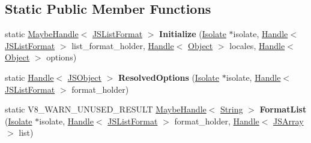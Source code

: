 \subsection*{Static Public Member Functions}
\begin{DoxyCompactItemize}
\item 
\mbox{\label{classv8_1_1internal_1_1JSListFormat_a1d611393a3198007804707acba4a9ff2}} 
static \mbox{\hyperlink{classv8_1_1internal_1_1MaybeHandle}{Maybe\+Handle}}$<$ \mbox{\hyperlink{classv8_1_1internal_1_1JSListFormat}{J\+S\+List\+Format}} $>$ {\bfseries Initialize} (\mbox{\hyperlink{classv8_1_1internal_1_1Isolate}{Isolate}} $\ast$isolate, \mbox{\hyperlink{classv8_1_1internal_1_1Handle}{Handle}}$<$ \mbox{\hyperlink{classv8_1_1internal_1_1JSListFormat}{J\+S\+List\+Format}} $>$ list\+\_\+format\+\_\+holder, \mbox{\hyperlink{classv8_1_1internal_1_1Handle}{Handle}}$<$ \mbox{\hyperlink{classv8_1_1internal_1_1Object}{Object}} $>$ locales, \mbox{\hyperlink{classv8_1_1internal_1_1Handle}{Handle}}$<$ \mbox{\hyperlink{classv8_1_1internal_1_1Object}{Object}} $>$ options)
\item 
\mbox{\label{classv8_1_1internal_1_1JSListFormat_a7a9e5f699099574bb05e18cb330591bd}} 
static \mbox{\hyperlink{classv8_1_1internal_1_1Handle}{Handle}}$<$ \mbox{\hyperlink{classv8_1_1internal_1_1JSObject}{J\+S\+Object}} $>$ {\bfseries Resolved\+Options} (\mbox{\hyperlink{classv8_1_1internal_1_1Isolate}{Isolate}} $\ast$isolate, \mbox{\hyperlink{classv8_1_1internal_1_1Handle}{Handle}}$<$ \mbox{\hyperlink{classv8_1_1internal_1_1JSListFormat}{J\+S\+List\+Format}} $>$ format\+\_\+holder)
\item 
\mbox{\label{classv8_1_1internal_1_1JSListFormat_a145a8d949165058c937511f1bfebf56b}} 
static V8\+\_\+\+W\+A\+R\+N\+\_\+\+U\+N\+U\+S\+E\+D\+\_\+\+R\+E\+S\+U\+LT \mbox{\hyperlink{classv8_1_1internal_1_1MaybeHandle}{Maybe\+Handle}}$<$ \mbox{\hyperlink{classv8_1_1internal_1_1String}{String}} $>$ {\bfseries Format\+List} (\mbox{\hyperlink{classv8_1_1internal_1_1Isolate}{Isolate}} $\ast$isolate, \mbox{\hyperlink{classv8_1_1internal_1_1Handle}{Handle}}$<$ \mbox{\hyperlink{classv8_1_1internal_1_1JSListFormat}{J\+S\+List\+Format}} $>$ format\+\_\+holder, \mbox{\hyperlink{classv8_1_1internal_1_1Handle}{Handle}}$<$ \mbox{\hyperlink{classv8_1_1internal_1_1JSArray}{J\+S\+Array}} $>$ list)

\end{DoxyCompactItemize}

